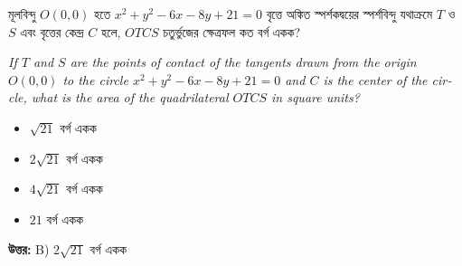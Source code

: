 \documentclass[12pt, a4paper]{article}
\begin{document}
\vspace{2em}

\begin{tcolorbox}[questionbox={প্রশ্ন (Question) 5}]
    \noindent
    মূলবিন্দু $O(0, 0)$ হতে $x^2 + y^2 - 6x - 8y + 21 = 0$ বৃত্তে অঙ্কিত স্পর্শকদ্বয়ের স্পর্শবিন্দু যথাক্রমে $T$ ও $S$ এবং বৃত্তের কেন্দ্র $C$ হলে, $OTCS$ চতুর্ভুজের ক্ষেত্রফল কত বর্গ একক?
    
    \vspace{0.8em}
    \begin{english}
    \noindent\textit{\color{darkgray}
    If $T$ and $S$ are the points of contact of the tangents drawn from the origin $O(0, 0)$ to the circle $x^2 + y^2 - 6x - 8y + 21 = 0$ and $C$ is the center of the circle, what is the area of the quadrilateral $OTCS$ in square units?
    }
    \end{english}
\end{tcolorbox}

\begin{itemize}[label={}, leftmargin=1cm, itemsep=0.5em]
    \item[\textbf{A)}] $\sqrt{21}$ বর্গ একক
    \item[\textbf{B)}] $2\sqrt{21}$ বর্গ একক
    \item[\textbf{C)}] $4\sqrt{21}$ বর্গ একক
    \item[\textbf{D)}] $21$ বর্গ একক
\end{itemize}

\vspace{0.5em}
\begin{tcolorbox}[answerbox]
    \textbf{\color{success} উত্তর:} B) $2\sqrt{21}$ বর্গ একক
\end{tcolorbox}
\vspace{1em}
\end{document}
